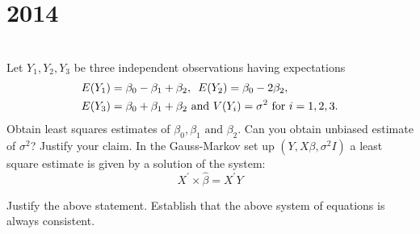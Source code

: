 \section*{2014}
\vspace{-.5cm}
\hrulefill \smallskip\\
 Let $Y_1,Y_2,Y_3$ be three independent observations having expectations \[ \begin{aligned}
    E(Y_1) &= \beta_0 - \beta_1 + \beta_2,\enskip E(Y_2) = \beta_0 - 2\beta_2, \\
    E(Y_3) &= \beta_0+\beta_1+\beta_2 \text{ and } V(Y_i) = \sigma^2 \text{ for } i = 1,2,3.
\end{aligned} \] Obtain least squares estimates of $\beta_0,\beta_1 \text{ and } \beta_2$. Can you obtain unbiased estimate of $\sigma^2$? Justify your claim.
\myline
{} In the Gauss-Markov set up $(Y,X\beta,\sigma^2I)$ a least square estimate is given by a solution of the system:
\[ X^{\prime}\times\hat{\beta} = X^{\prime}Y\] \begin{tasks}
\task Justify the above statement.
\task Establish that the above system of equations is always consistent. \end{tasks}